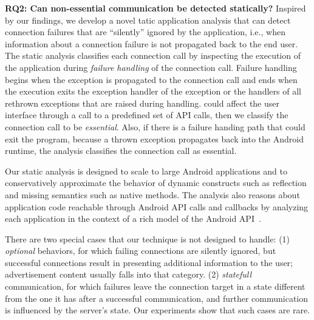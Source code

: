 \vspace{0.1in}
\noindent 
{\bf RQ2: Can non-essential communication be detected statically?}
Inspired by our findings, we develop a novel tatic application
analysis that can detect connection failures that are ``silently''
ignored by the application, i.e., when information about a connection
failure is not propagated back to the end user.  The static analysis
classifies each connection call by inspecting the execution of the
application during {\it failure handling} of the connection call.
Failure handling begins when the exception is propagated to the
connection call and ends when the execution exits the exception
handler of the exception or the handlers of all rethrown exceptions
that are raised during handling.  could affect the user interface
through a call to a predefined set of API calls, then we classify the
connection call to be {\em essential}.  Also, if there is a failure handing
path that could exit the program, because a thrown exception
propagates back into the Android runtime, the analysis classifies the
connection call as essential.

Our static analysis is designed to scale to large Android applications
and to conservatively approximate the behavior of dynamic constructs
such as reflection and missing semantics such as native methods.  The
analysis also reasons about application code reachable through Android
API calls and callbacks by analyzing each application in the context
of a rich model of the Android
API~\cite{Gordon:Kim:Perkins:Gilham:Nguyen:Rinard:NDSS15}. 

There are two special cases that our technique is not designed to handle: (1) \emph{optional} behaviors, for which failing connections are silently ignored, but successful connections result in presenting additional information to the user; 
advertisement content usually falls into that category. (2) \emph{statefull} communication, for which failures leave the 
connection target in a state different from the one it has after a successful communication, and further communication is influenced by the server's state. Our experiments show that such cases are rare. 

%
 

